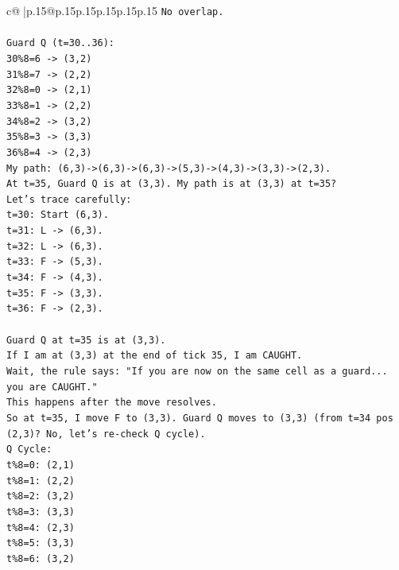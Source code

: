 \documentclass{article}
\begin{document}
{\begin{supertabular}{c@{$\;$}|p{.15\linewidth}@{}p{.15\linewidth}p{.15\linewidth}p{.15\linewidth}p{.15\linewidth}p{.15\linewidth}}
{{{\texttt{No overlap.} \\
\\ 
\texttt{Guard Q (t=30..36):} \\
\texttt{30\%8=6 {-}> (3,2)} \\
\texttt{31\%8=7 {-}> (2,2)} \\
\texttt{32\%8=0 {-}> (2,1)} \\
\texttt{33\%8=1 {-}> (2,2)} \\
\texttt{34\%8=2 {-}> (3,2)} \\
\texttt{35\%8=3 {-}> (3,3)} \\
\texttt{36\%8=4 {-}> (2,3)} \\
\texttt{My path: (6,3){-}>(6,3){-}>(6,3){-}>(5,3){-}>(4,3){-}>(3,3){-}>(2,3).} \\
\texttt{At t=35, Guard Q is at (3,3). My path is at (3,3) at t=35?} \\
\texttt{Let's trace carefully:} \\
\texttt{t=30: Start (6,3).} \\
\texttt{t=31: L {-}> (6,3).} \\
\texttt{t=32: L {-}> (6,3).} \\
\texttt{t=33: F {-}> (5,3).} \\
\texttt{t=34: F {-}> (4,3).} \\
\texttt{t=35: F {-}> (3,3).} \\
\texttt{t=36: F {-}> (2,3).} \\
\\ 
\texttt{Guard Q at t=35 is at (3,3).} \\
\texttt{If I am at (3,3) at the end of tick 35, I am CAUGHT.} \\
\texttt{Wait, the rule says: "If you are now on the same cell as a guard... you are CAUGHT."} \\
\texttt{This happens after the move resolves.} \\
\texttt{So at t=35, I move F to (3,3). Guard Q moves to (3,3) (from t=34 pos (2,3)? No, let's re{-}check Q cycle).} \\
\texttt{Q Cycle:} \\
\texttt{t\%8=0: (2,1)} \\
\texttt{t\%8=1: (2,2)} \\
\texttt{t\%8=2: (3,2)} \\
\texttt{t\%8=3: (3,3)} \\
\texttt{t\%8=4: (2,3)} \\
\texttt{t\%8=5: (3,3)} \\
\texttt{t\%8=6: (3,2)} \\
}}}
\end{supertabular}}
\end{document}
